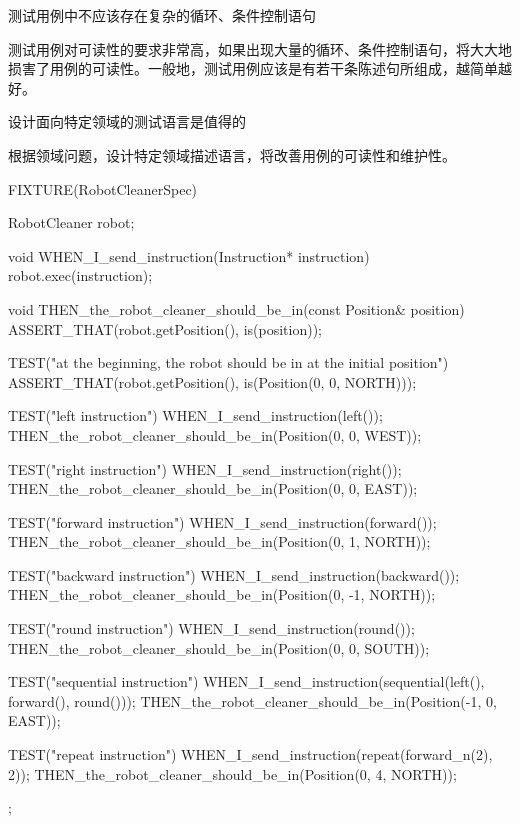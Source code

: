 \begin{content}
\begin{regulation}
测试用例中不应该存在复杂的循环、条件控制语句
\end{regulation}

测试用例对可读性的要求非常高，如果出现大量的循环、条件控制语句，将大大地损害了用例的可读性。一般地，测试用例应该是有若干条陈述句所组成，越简单越好。

\begin{regulation}
设计面向特定领域的测试语言是值得的
\end{regulation}

根据领域问题，设计特定领域描述语言，将改善用例的可读性和维护性。

\begin{leftbar}
\begin{c++}[caption={\ttfamily{robot/RobotCleanerSpec.cpp}}]
FIXTURE(RobotCleanerSpec)
{
    RobotCleaner robot;

    void WHEN_I_send_instruction(Instruction* instruction)
    {
        robot.exec(instruction);
    }

    void THEN_the_robot_cleaner_should_be_in(const Position& position)
    {
        ASSERT_THAT(robot.getPosition(), is(position));
    }

    TEST("at the beginning, the robot should be in at the initial position")
    {
        ASSERT_THAT(robot.getPosition(), is(Position(0, 0, NORTH)));
    }

    TEST("left instruction")
    {
        WHEN_I_send_instruction(left());
        THEN_the_robot_cleaner_should_be_in(Position(0, 0, WEST));
    }

    TEST("right instruction")
    {
        WHEN_I_send_instruction(right());
        THEN_the_robot_cleaner_should_be_in(Position(0, 0, EAST));
    }

    TEST("forward instruction")
    {
        WHEN_I_send_instruction(forward());
        THEN_the_robot_cleaner_should_be_in(Position(0, 1, NORTH));
    }

    TEST("backward instruction")
    {
        WHEN_I_send_instruction(backward());
        THEN_the_robot_cleaner_should_be_in(Position(0, -1, NORTH));
    }

    TEST("round instruction")
    {
        WHEN_I_send_instruction(round());
        THEN_the_robot_cleaner_should_be_in(Position(0, 0, SOUTH));
    }

    TEST("sequential instruction")
    {
        WHEN_I_send_instruction(sequential(left(), forward(), round()));
        THEN_the_robot_cleaner_should_be_in(Position(-1, 0, EAST));
    }

    TEST("repeat instruction")
    {
        WHEN_I_send_instruction(repeat(forward_n(2), 2));
        THEN_the_robot_cleaner_should_be_in(Position(0, 4, NORTH));
    }
};
\end{c++}
\end{leftbar}

\end{content}
